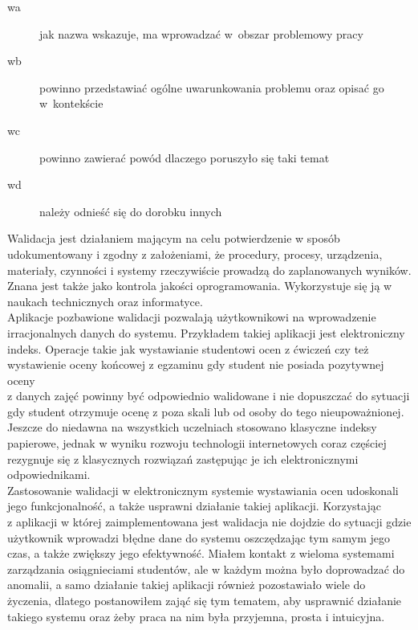 \documentclass[brudnopis]{xmgr}
\begin{document}
\maketitle
%
\introduction

\begin{description}
\item[wa] \textcolor{wa}{jak nazwa wskazuje, ma wprowadzać 
  w~obszar problemowy pracy}
\item[wb] \textcolor{wb}{powinno przedstawiać ogólne 
  uwarunkowania problemu oraz opisać go w~kontekście}
\item[wc] \textcolor{wc}{powinno zawierać powód dlaczego 
  poruszyło się taki temat}
\item[wd] \textcolor{wd}{należy odnieść się do dorobku innych}
\end{description}

\textcolor{wa}{Walidacja jest działaniem mającym na celu potwierdzenie w sposób udokumentowany i zgodny
z założeniami, że procedury, procesy, urządzenia, materiały, czynności i systemy rzeczywiście
prowadzą do zaplanowanych wyników. Znana jest także jako kontrola jakości oprogramowania.
Wykorzystuje się ją w naukach technicznych oraz informatyce.}
\\

\textcolor{wa}{Aplikacje pozbawione walidacji pozwalają użytkownikowi na wprowadzenie
irracjonalnych danych do systemu.} \textcolor{wb}{Przykładem takiej aplikacji jest elektroniczny indeks.
Operacje takie jak wystawianie studentowi ocen z ćwiczeń czy też wystawienie
oceny końcowej z egzaminu gdy student nie posiada pozytywnej oceny
\\
z danych zajęć powinny być odpowiednio
walidowane i nie dopuszczać do sytuacji gdy student otrzymuje ocenę z poza skali lub od osoby do tego nieupoważnionej.}
\textcolor{wb}{Jeszcze do niedawna na wszystkich uczelniach stosowano klasyczne indeksy papierowe,
jednak w wyniku rozwoju technologii internetowych coraz częściej rezygnuje się z klasycznych
rozwiązań zastępując je ich elektronicznymi odpowiednikami.}
\\

\textcolor{wc}{Zastosowanie walidacji w elektronicznym
systemie wystawiania ocen udoskonali jego funkcjonalność, a także usprawni działanie takiej aplikacji.
Korzystając 
\\
z aplikacji w której zaimplementowana jest walidacja nie dojdzie do sytuacji gdzie użytkownik wprowadzi błędne dane do systemu oszczędzając tym samym jego czas, a także zwiększy jego efektywność. 
Miałem kontakt z wieloma systemami zarządzania osiągnieciami studentów, ale w każdym można było doprowadzać
do anomalii, a samo działanie takiej aplikacji również pozostawiało wiele do życzenia, dlatego postanowiłem zająć się tym tematem,
aby usprawnić działanie takiego systemu oraz żeby praca na nim była przyjemna, prosta i intuicyjna. }
\\
\end{document}
